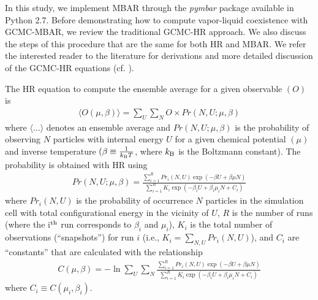 \documentclass[journal=jced,manuscript=article]{achemso}
\begin{document}
In this study, we implement MBAR through the \textit{pymbar} package available in Python 2.7. Before demonstrating how to compute vapor-liquid coexistence with GCMC-MBAR, we review the traditional GCMC-HR approach. We also discuss the steps of this procedure that are the same for both HR and MBAR. We refer the interested reader to the literature for derivations and more detailed discussion of the GCMC-HR equations (cf. ).


The HR equation to compute the ensemble average for a given observable $(O)$ is 
\begin{eqnarray} \label{eq: HR ave}
\langle O(\mu,\beta) \rangle = \sum_{U} \sum_{N} O \times Pr(N,U;\mu,\beta)
\end{eqnarray}
where $\langle \dots \rangle$ denotes an ensemble average and $Pr(N,U;\mu,\beta)$ is the probability of observing $N$ particles with internal energy $U$ for a given chemical potential $(\mu)$ and inverse temperature $(\beta \equiv \frac{1}{k_{\rm B}T}$, where $k_{\rm B}$ is the Boltzmann constant). The probability is obtained with HR using 
\begin{eqnarray} \label{eq: HR prob}
Pr(N,U;\mu,\beta) = \frac{\sum_{i=1}^{R} Pr_i(N,U)  \exp(-\beta U + \beta \mu N)}{\sum_{i=1}^{R} K_i \exp(-\beta_i U + \beta_i \mu_i N + C_i)}
\end{eqnarray}
where $Pr_i(N,U)$ is the probability of occurrence $N$ particles in the simulation cell with total configurational energy in the vicinity of $U$, $R$ is the number of runs (where the i$^{\rm th}$ run corresponds to $\beta_i$ and $\mu_i$), $K_{i}$ is the total number of observations (``snapshots'') for run $i$ (i.e., $K_{i} = \sum_{N,U} Pr_i(N,U)$), and $C_i$ are ``constants'' that are calculated with the relationship
\begin{eqnarray} \label{eq: Weights}
C(\mu,\beta) = - \ln \sum_{U} \sum_{N} \frac{\sum_{i=1}^{R} Pr_i(N,U) \exp(-\beta U + \beta \mu N)}{\sum_{i=1}^{R} K_i \exp(-\beta_i U + \beta_i \mu_i N + C_i)}
\end{eqnarray}
where $C_i \equiv C(\mu_i,\beta_i)$.
\end{document}
